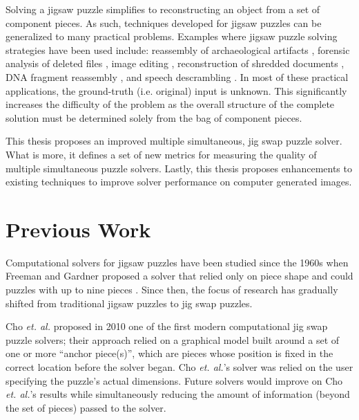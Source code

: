 \documentclass{report}
\begin{document}
Solving a jigsaw puzzle simplifies to reconstructing an object from a set of component pieces.  As such, techniques developed for jigsaw puzzles can be generalized to many practical problems.  Examples where jigsaw puzzle solving strategies have been used include: reassembly of archaeological artifacts \cite{brown2008, koller2006}, forensic analysis of deleted files \cite{garfinkel2010}, image editing \cite{cho2008}, reconstruction of shredded documents \cite{zhu2008}, DNA fragment reassembly \cite{marande2007}, and speech descrambling \cite{zhao2007}.  In most of these practical applications, the ground-truth (i.e. original) input is unknown.  This significantly increases the difficulty of the problem as the overall structure of the complete solution must be determined solely from the bag of component pieces.

This thesis proposes an improved multiple simultaneous, jig swap puzzle solver.  What is more, it defines a set of new metrics for measuring the quality of multiple simultaneous puzzle solvers.  Lastly, this thesis proposes enhancements to existing techniques to improve solver performance on computer generated images.







\pagebreak
\section{Previous Work}\label{sec:previousWork}

Computational solvers for jigsaw puzzles have been studied since the 1960s when Freeman and Gardner proposed a solver that relied only on piece shape and could puzzles with up to nine pieces \cite{freeman1964}.  Since then, the focus of research has gradually shifted from traditional jigsaw puzzles to jig swap puzzles.  

Cho \textit{et. al.} \citep{cho2010} proposed in 2010 one of the first modern computational jig swap puzzle solvers; their approach relied on a graphical model built around a set of one or more ``anchor piece(s)'', which are pieces whose position is fixed in the correct location before the solver began.  Cho \textit{et. al.}'s solver was relied on the user specifying the puzzle's actual dimensions.  Future solvers would improve on Cho \textit{et. al.}'s results while simultaneously reducing the amount of information (beyond the set of pieces) passed to the solver.
\end{document}
